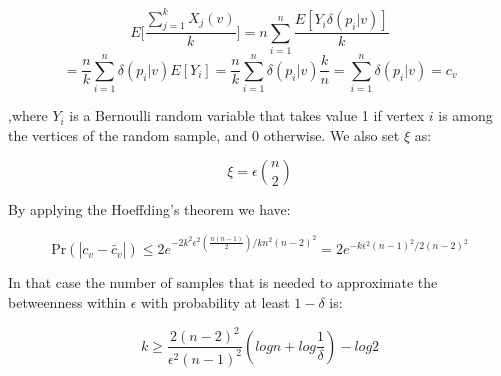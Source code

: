 \begin{displaymath}
E\Big[\frac{\sum_{j=1}^{k}X_{j}(v)}{k}\Big]=n\sum_{i=1}^{n}\frac{E[Y_{i}\delta (p_{i}|v)]}{k}
\end{displaymath}
\begin{displaymath}
=\frac{n}{k}\sum_{i=1}^{n}\delta(p_{i}|v)E[Y_{i}]=\frac{n}{k}\sum_{i=1}^{n}\delta(p_{i}|v)\frac{k}{n}=\sum_{i=1}^{n}\delta(p_{i}|v)=c_{v}
\end{displaymath}

,where $Y_{i}$ is a Bernoulli random variable that takes value 1 if vertex $i$ is among the vertices of the random sample, and 0 otherwise.
We also set $\xi$ as:
 
\begin{displaymath}
\xi=\epsilon\binom{n}{2}
\end{displaymath}

 By applying the Hoeffding's theorem we have:
 
\begin{displaymath}
\mbox{Pr}(|c_{v}-\tilde{c_{v}}|)\leq 2e^{-2k^2\epsilon^2(\frac{n(n-1)}{2})/kn^2(n-2)^2}=2e^{-k\epsilon^2(n-1)^2/2(n-2)^2}
\end{displaymath}

In that case the number of samples that is needed to approximate the betweenness within $\epsilon$ with probability at least $1-\delta$ is: 

\begin{displaymath}
k\geq \frac{2(n-2)^2}{\epsilon^2(n-1)^2}(logn +log\frac{1}{\delta})-log{2}
\end{displaymath}






